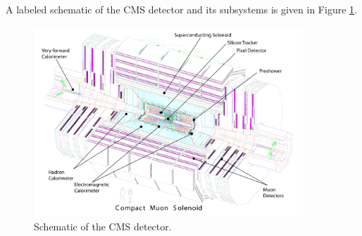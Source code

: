 A labeled schematic of the CMS detector and its subsystems is given in Figure \ref{fig:cmsdetector}.
\begin{figure}[ht]
\centering
\includegraphics[width=0.9\textwidth]{plots/cmsdetector.pdf}
\caption{Schematic of the CMS detector\cite{CMS_DETECTOR}.}
\label{fig:cmsdetector}
\end{figure}








